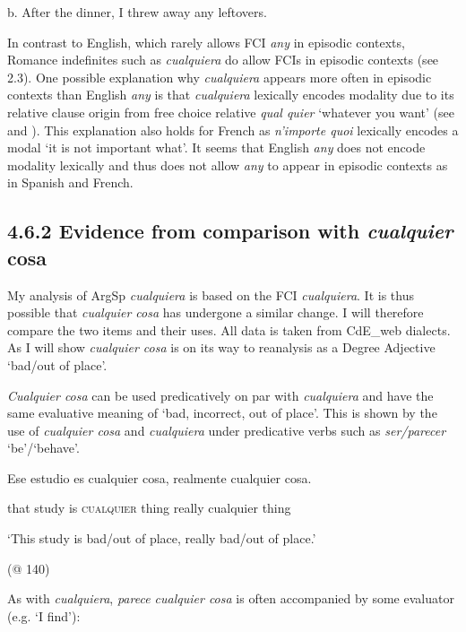 b. After the dinner, I threw away any leftovers. 

    \citep[446]{Dayal1998}

In contrast to English, which rarely allows FCI \textit{any} in episodic contexts, Romance indefinites such as \textit{cualquiera} do allow FCIs in episodic contexts (see 2.3). One possible explanation why \textit{cualquiera} appears more often in episodic contexts than English \textit{any} is that \textit{cualquiera} lexically encodes modality due to its relative clause origin from free choice relative \textit{qual quier} ‘whatever you want’ (see \citealt{Rivero2011} and ). This explanation also holds for French as \textit{n’importe quoi} lexically encodes a modal ‘it is not important what’. It seems that English \textit{any} does not encode modality lexically and thus does not allow \textit{any} to appear in episodic contexts as in Spanish and French. 

\subsection{\textbf{4.6.2} \textbf{Evidence} \textbf{from} \textbf{comparison} \textbf{with} \textbf{\textit{cualquier} \textbf{cosa}}}

My analysis of ArgSp \textit{cualquiera} is based on the FCI \textit{cualquiera}. It is thus possible that \textit{cualquier cosa} has undergone a similar change. I will therefore compare the two items and their uses. All data is taken from CdE\_web dialects. As I will show \textit{cualquier cosa} is on its way to reanalysis as a Degree Adjective ‘bad/out of place’. 

 \textit{Cualquier cosa} can be used predicatively on par with \textit{cualquiera} and have the same evaluative meaning of ‘bad, incorrect, out of place’. This is shown by the use of \textit{cualquier cosa} and \textit{cualquiera} under predicative verbs such as \textit{ser/parecer} ‘be’/‘behave’.

    Ese  estudio  es  cualquier  cosa,  realmente  cualquier  cosa.

    that  study  is  \textsc{cualquier}  thing  really  cualquier  thing

    ‘This study is bad/out of place, really bad/out of place.’

    (@ 140)

As with \textit{cualquiera}, \textit{parece cualquier cosa} is often accompanied by some evaluator (e.g. ‘I find’):

